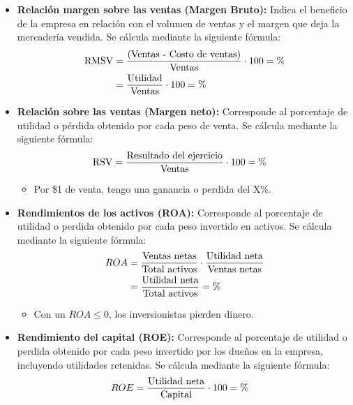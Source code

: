 \documentclass{templateNote}
\begin{document}
\begin{itemize}
    \item \textbf{Relación margen sobre las ventas (Margen Bruto):} Indica el beneficio de la empresa en relación con el volumen de ventas y el margen que deja la mercadería vendida. Se cálcula mediante la siguiente fórmula:
    \begin{align*}
        \textnormal{RMSV} &= \frac{\textnormal{(\textnormal{Ventas} - \textnormal{Costo de ventas})}}{\textnormal{Ventas}} \cdot 100 = \% \\
        &= \frac{\textnormal{Utilidad}}{\textnormal{Ventas}} \cdot 100 = \%
    \end{align*}
    \item \textbf{Relación sobre las ventas (Margen neto):} Corresponde al porcentaje de utilidad o pérdida obtenido por cada peso de venta. Se cálcula mediante la siguiente fórmula: 
    \begin{align*}
        \textnormal{RSV} &= \frac{\textnormal{Resultado del ejercicio}}{\textnormal{Ventas}} \cdot 100 = \%
    \end{align*}
    \begin{itemize}
        \item Por \$1 de venta, tengo una ganancia o perdida del X\%.
    \end{itemize}
    \item \textbf{Rendimientos de los activos (ROA):} Corresponde al porcentaje de utilidad o perdida obtenido por cada peso invertido en activos. Se cálcula mediante la siguiente fórmula:
    \begin{align*}
        ROA &= \frac{\textnormal{Ventas netas}}{\textnormal{Total activos}} \cdot \frac{\textnormal{Utilidad neta}}{\textnormal{Ventas netas}}\\ 
        &= \frac{\textnormal{Utilidad neta}}{\textnormal{Total activos}} = \%
    \end{align*}
    \begin{itemize}
        \item Con un $ROA \leq 0$, los inversionistas pierden dinero.
    \end{itemize}
    \item \textbf{Rendimiento del capital (ROE):} Corresponde al porcentaje de utilidad o perdida obtenido por cada peso invertido por los dueños en la empresa, incluyendo utilidades retenidas. Se cálcula mediante la siguiente fórmula:
    \begin{align*}
        ROE &= \frac{\textnormal{Utilidad neta}}{\textnormal{Capital}} \cdot 100 = \%
    \end{align*}
\end{itemize}
\end{document}
